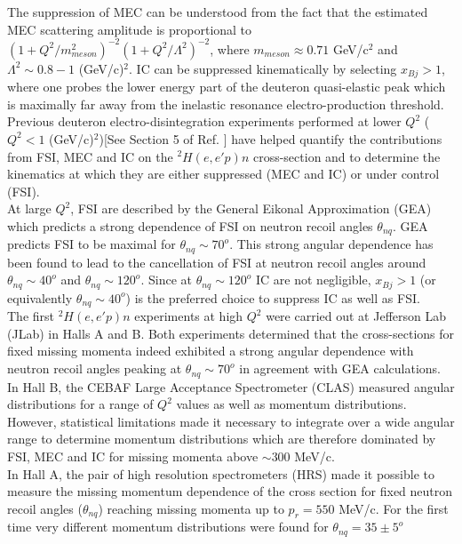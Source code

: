 The suppression of MEC can be understood from the fact that the estimated MEC scattering amplitude is proportional to  $(1 + Q^{2}/m^{2}_{meson})^{-2}(1+Q^{2}/\Lambda^{2})^{-2}$, where $m_{meson}\approx0.71$ GeV/c$^{2}$ and
$\Lambda^{2}\sim 0.8-1 $ (GeV/c)$^{2}$\cite{Sargsian_2001}. IC can be suppressed kinematically by selecting $x_{Bj}>1$, where one probes the lower energy part of the deuteron quasi-elastic peak which is maximally far away from the inelastic resonance
electro-production threshold.\\
\indent Previous deuteron electro-disintegration experiments performed at lower $Q^{2}$ ($Q^{2}<1$ (GeV/c)$^{2}$)[See Section 5 of Ref. \cite{sargsian_2015}] have helped quantify the contributions
from FSI, MEC and IC on the $^{2}H(e,e'p)n$ cross-section and to determine the kinematics at which they are either suppressed (MEC and IC) or under control (FSI).  \\
\indent At large $Q^{2}$, FSI are described by the General Eikonal Approximation (GEA)\cite{Sargsian_2001,PhysRevC.56.1124,sargsian_2015} which predicts a strong dependence of FSI on neutron recoil angles $\theta_{nq}$.
GEA predicts FSI to be maximal for $\theta_{nq}\sim70^{o}$. This strong angular dependence has been found to lead to the cancellation of FSI at neutron recoil angles around $\theta_{nq}\sim40^{o}$ and $\theta_{nq}\sim120^{o}$. Since at $\theta_{nq}\sim120^{o}$ IC are not negligible, $x_{Bj}>1$ (or equivalently $\theta_{nq}\sim40^{o}$) is the preferred choice to suppress IC as well as FSI. \\
\indent The first $^{2}H(e,e'p)n$ experiments at high $Q^{2}$ were carried out at Jefferson Lab (JLab) in Halls A\cite{PhysRevLett.107.262501} and B\cite{PhysRevLett.98.262502}. Both
experiments determined that the cross-sections for fixed missing momenta indeed exhibited a strong angular dependence with neutron recoil angles peaking
at $\theta_{nq} \sim 70^{o}$ in agreement with GEA\cite{Sargsian_2001,PhysRevC.56.1124} calculations. In Hall B, the CEBAF Large Acceptance Spectrometer (CLAS) measured angular
distributions for  a range of $Q^2$ values as well as momentum distributions. However, statistical limitations made it necessary to integrate over a wide angular range to determine momentum distributions
which are therefore dominated by  FSI, MEC and IC for missing momenta above $\sim 300$ MeV/c. \\
\indent In Hall A, the pair of high resolution spectrometers (HRS) made it possible to measure the missing  momentum dependence of the cross section for fixed neutron recoil angles ($\theta_{nq}$) reaching missing momenta up to $p_{r}=550$ MeV/c. For the first time very different momentum distributions were found for $\theta_{nq}=35\pm5^{o}$
